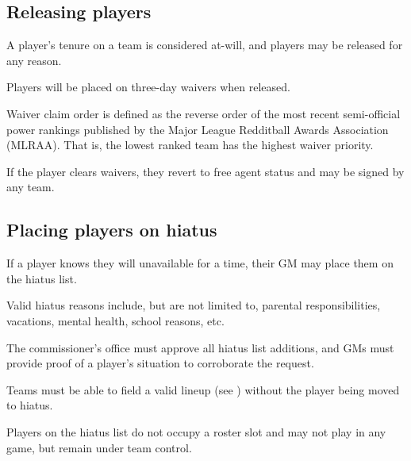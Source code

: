 \subsection{Releasing players}
\begin{deepEnumerate}
	\item A player's tenure on a team is considered at-will, 
	and players may be released for any reason.
	\item Players will be placed on three-day waivers when released.
	\begin{deepEnumerate}
		\item Waiver claim order is defined as the reverse order 
		of the most recent semi-official power rankings 
		published by the Major League Redditball Awards Association (MLRAA).
		That is, the lowest ranked team has the highest waiver priority.
		\item If the player clears waivers, 
		they revert to free agent status and may be signed by any team.
	\end{deepEnumerate}
\end{deepEnumerate}

\subsection{Placing players on hiatus}
\begin{deepEnumerate}
	\item If a player knows they will unavailable for a time,
	their GM may place them on the hiatus list.
	\begin{deepEnumerate}
		\item Valid hiatus reasons include, but are not limited to,
		parental responsibilities, vacations, mental health, school reasons, etc.
		\item The commissioner’s office must approve all hiatus list additions,
		and GMs must provide proof of a player's situation to corroborate the request.
		\item Teams must be able to field a valid lineup (see )
		without the player being moved to hiatus.
	\end{deepEnumerate}
	\item Players on the hiatus list do not occupy a roster slot
	and may not play in any game,
	but remain under team control.
\end{deepEnumerate}

